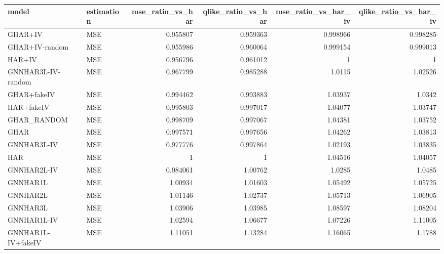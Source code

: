 \begin{tabular}{llrrrr}
\toprule
model & estimation & mse_ratio_vs_har & qlike_ratio_vs_har & mse_ratio_vs_har_iv & qlike_ratio_vs_har_iv \\
\midrule
GHAR+IV & MSE & 0.955807 & 0.959363 & 0.998966 & 0.998285 \\
GHAR+IV-random & MSE & 0.955986 & 0.960064 & 0.999154 & 0.999013 \\
HAR+IV & MSE & 0.956796 & 0.961012 & 1 & 1 \\
GNNHAR3L-IV-random & MSE & 0.967799 & 0.985288 & 1.0115 & 1.02526 \\
GHAR+fakeIV & MSE & 0.994462 & 0.993883 & 1.03937 & 1.0342 \\
HAR+fakeIV & MSE & 0.995803 & 0.997017 & 1.04077 & 1.03747 \\
GHAR_RANDOM & MSE & 0.998709 & 0.997067 & 1.04381 & 1.03752 \\
GHAR & MSE & 0.997571 & 0.997656 & 1.04262 & 1.03813 \\
GNNHAR3L-IV & MSE & 0.977776 & 0.997864 & 1.02193 & 1.03835 \\
HAR & MSE & 1 & 1 & 1.04516 & 1.04057 \\
GNNHAR2L-IV & MSE & 0.984061 & 1.00762 & 1.0285 & 1.0485 \\
GNNHAR1L & MSE & 1.00934 & 1.01603 & 1.05492 & 1.05725 \\
GNNHAR2L & MSE & 1.01146 & 1.02737 & 1.05713 & 1.06905 \\
GNNHAR3L & MSE & 1.03906 & 1.03985 & 1.08597 & 1.08204 \\
GNNHAR1L-IV & MSE & 1.02594 & 1.06677 & 1.07226 & 1.11005 \\
GNNHAR1L-IV+fakeIV & MSE & 1.11051 & 1.13284 & 1.16065 & 1.1788 \\
\bottomrule
\end{tabular}
